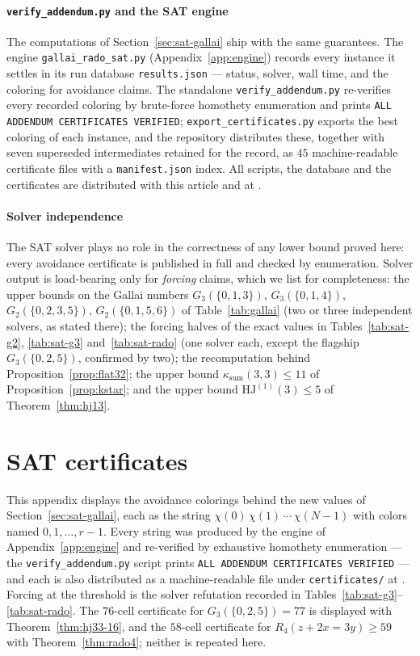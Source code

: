 \documentclass[12pt]{article}
\newcommand{\HJ}{\mathrm{HJ}}
\newcommand{\ksum}{\kappa_{\mathrm{sum}}}
\begin{document}
\paragraph{\texttt{verify\_addendum.py} and the SAT engine}
The computations of Section~\ref{sec:sat-gallai} ship with the same
guarantees. The engine \texttt{gallai\_rado\_sat.py}
(Appendix~\ref{app:engine}) records every instance it settles in its
run database \texttt{results.json} --- status, solver, wall time, and
the coloring for avoidance claims. The standalone
\texttt{verify\_addendum.py} re-verifies every recorded coloring by
brute-force homothety enumeration and prints \texttt{ALL ADDENDUM
CERTIFICATES VERIFIED}; \texttt{export\_certificates.py} exports the
best coloring of each instance, and the repository distributes these,
together with seven superseded intermediates retained for the record,
as $45$ machine-readable certificate files with a
\texttt{manifest.json} index. All scripts, the database and the
certificates are distributed with this article and at \cite{hjcerts}.

\paragraph{Solver independence}
The SAT solver plays no role in the correctness of any lower bound
proved here: every avoidance certificate is published in full and
checked by enumeration. Solver output is load-bearing only for
\emph{forcing} claims, which we list for completeness: the upper bounds
on the Gallai numbers $G_{3}(\{0,1,3\})$, $G_{3}(\{0,1,4\})$,
$G_{2}(\{0,2,3,5\})$, $G_{2}(\{0,1,5,6\})$ of Table~\ref{tab:gallai}
(two or three independent solvers, as stated there); the forcing
halves of the exact values in Tables~\ref{tab:sat-g2},
\ref{tab:sat-g3} and~\ref{tab:sat-rado} (one solver each, except the
flagship $G_{3}(\{0,2,5\})$, confirmed by two); the recomputation
behind Proposition~\ref{prop:flat32}; the upper bound
$\ksum(3,3)\le 11$ of Proposition~\ref{prop:kstar}; and the upper bound
$\HJ^{(1)}(3)\le 5$ of Theorem~\ref{thm:hj13}.


\section{SAT certificates}\label{app:certs}

This appendix displays the avoidance colorings behind the new values
of Section~\ref{sec:sat-gallai}, each as the string
$\chi(0)\,\chi(1)\,\cdots\,\chi(N-1)$ with colors named
$0,1,\dots,r-1$. Every string was produced by the engine of
Appendix~\ref{app:engine} and re-verified by exhaustive homothety
enumeration --- the \texttt{verify\_addendum.py} script prints
\texttt{ALL ADDENDUM CERTIFICATES VERIFIED} --- and each is also
distributed as a machine-readable file under \texttt{certificates/}
at \cite{hjcerts}. Forcing at the threshold is the solver refutation
recorded in Tables~\ref{tab:sat-g3}--\ref{tab:sat-rado}. The
$76$-cell certificate for $G_{3}(\{0,2,5\})=77$ is displayed with
Theorem~\ref{thm:hj33-16}, and the $58$-cell certificate for
$R_{4}(z+2x=3y)\ge 59$ with Theorem~\ref{thm:rado4}; neither is
repeated here.
\end{document}
